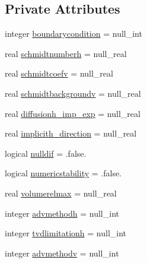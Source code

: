 \subsection*{Private Attributes}
\begin{DoxyCompactItemize}
\item 
integer \mbox{\hyperlink{structmoduleporousmediaproperties_1_1t__advectiondiffusion_ae2922e31c7bca4c4e47c0e02d0742323}{boundarycondition}} = null\+\_\+int
\item 
real \mbox{\hyperlink{structmoduleporousmediaproperties_1_1t__advectiondiffusion_ada5f15e114cf36759fd692789abbff08}{schmidtnumberh}} = null\+\_\+real
\item 
real \mbox{\hyperlink{structmoduleporousmediaproperties_1_1t__advectiondiffusion_a883407674aac9a8a82688dec63dac366}{schmidtcoefv}} = null\+\_\+real
\item 
real \mbox{\hyperlink{structmoduleporousmediaproperties_1_1t__advectiondiffusion_a673628f0d78177cb155d3a45cba6231c}{schmidtbackgroundv}} = null\+\_\+real
\item 
real \mbox{\hyperlink{structmoduleporousmediaproperties_1_1t__advectiondiffusion_a7071d1113a8c4441e405c494df181388}{diffusionh\+\_\+imp\+\_\+exp}} = null\+\_\+real
\item 
real \mbox{\hyperlink{structmoduleporousmediaproperties_1_1t__advectiondiffusion_a300391042e64468ded2b4fcbed20d29c}{implicith\+\_\+direction}} = null\+\_\+real
\item 
logical \mbox{\hyperlink{structmoduleporousmediaproperties_1_1t__advectiondiffusion_a1b04e58c3be99a81e83868d3fe10c7ca}{nulldif}} = .false.
\item 
logical \mbox{\hyperlink{structmoduleporousmediaproperties_1_1t__advectiondiffusion_a95c9e6f833158c3493afaba6ef5b05ee}{numericstability}} = .false.
\item 
real \mbox{\hyperlink{structmoduleporousmediaproperties_1_1t__advectiondiffusion_afb1a524f0db8bdc7797f3241013c6496}{volumerelmax}} = null\+\_\+real
\item 
integer \mbox{\hyperlink{structmoduleporousmediaproperties_1_1t__advectiondiffusion_ad55337eb18ef6d4b3b4682d6dafefc0a}{advmethodh}} = null\+\_\+int
\item 
integer \mbox{\hyperlink{structmoduleporousmediaproperties_1_1t__advectiondiffusion_ad38614100fd5d0f044249dc31f741897}{tvdlimitationh}} = null\+\_\+int
\item 
integer \mbox{\hyperlink{structmoduleporousmediaproperties_1_1t__advectiondiffusion_a42c35e5df82d1949cc834d99a85ed04d}{advmethodv}} = null\+\_\+int

\end{DoxyCompactItemize}
